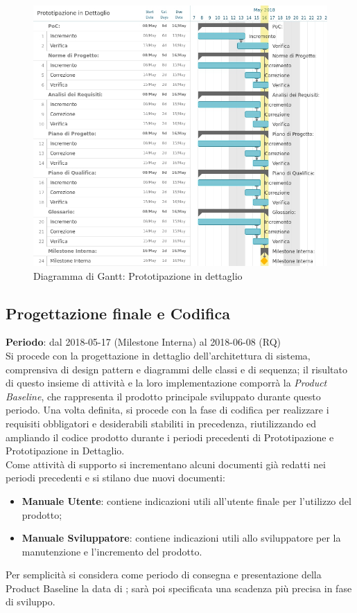 \begin{figure}[h!]
	\centerline{\includegraphics[scale=0.55]{img/DiagrammiGantt/PrototipazioneDettaglio.jpg}}
	\caption{Diagramma di Gantt: Prototipazione in dettaglio}
	\label{fig:gantt_prot_dett}
\end{figure}
\clearpage

\subsection{Progettazione finale e Codifica}
\textbf{Periodo}: dal 2018-05-17 (Milestone Interna) al 2018-06-08 (RQ)\\

Si procede con la progettazione in dettaglio dell'architettura di sistema, comprensiva di design pattern e diagrammi delle classi e di sequenza; il risultato di questo insieme di attività e la loro implementazione comporrà la \emph{Product Baseline}, che rappresenta il prodotto principale sviluppato durante questo periodo. Una volta definita, si procede con la fase di codifica per realizzare i requisiti obbligatori e desiderabili stabiliti in precedenza, riutilizzando ed ampliando il codice prodotto durante i periodi precedenti di Prototipazione e Prototipazione in Dettaglio. \\
Come attività di supporto si incrementano alcuni documenti già redatti nei periodi precedenti e si stilano due nuovi documenti:
\begin{itemize}
	\item \textbf{Manuale Utente}: contiene indicazioni utili all'utente finale per l'utilizzo del prodotto;
	\item \textbf{Manuale Sviluppatore}: contiene indicazioni utili allo sviluppatore per la manutenzione e l'incremento del prodotto.
\end{itemize}
Per semplicità si considera come periodo di consegna e presentazione della Product Baseline la data di \RQ{}; sarà poi specificata una scadenza più precisa in fase di sviluppo.


